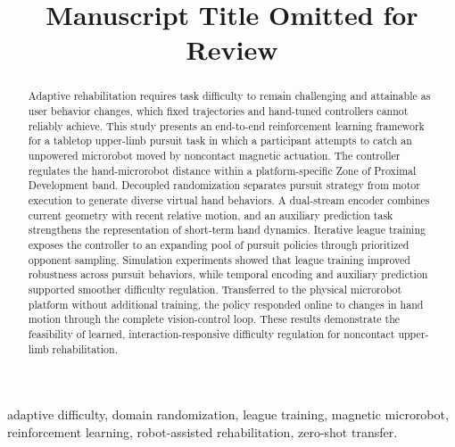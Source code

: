 \documentclass[journal,twoside,web]{ieeecolor2}
\begin{document}
\title{Manuscript Title Omitted for Review}
\author{}
\maketitle
\begin{abstract}
Adaptive rehabilitation requires task difficulty to remain challenging and attainable as user behavior changes, which fixed trajectories and hand-tuned controllers cannot reliably achieve. This study presents an end-to-end reinforcement learning framework for a tabletop upper-limb pursuit task in which a participant attempts to catch an unpowered microrobot moved by noncontact magnetic actuation. The controller regulates the hand-microrobot distance within a platform-specific Zone of Proximal Development band. Decoupled randomization separates pursuit strategy from motor execution to generate diverse virtual hand behaviors. A dual-stream encoder combines current geometry with recent relative motion, and an auxiliary prediction task strengthens the representation of short-term hand dynamics. Iterative league training exposes the controller to an expanding pool of pursuit policies through prioritized opponent sampling. Simulation experiments showed that league training improved robustness across pursuit behaviors, while temporal encoding and auxiliary prediction supported smoother difficulty regulation. Transferred to the physical microrobot platform without additional training, the policy responded online to changes in hand motion through the complete vision-control loop. These results demonstrate the feasibility of learned, interaction-responsive difficulty regulation for noncontact upper-limb rehabilitation.
\end{abstract}
\begin{IEEEkeywords}
adaptive difficulty, domain randomization, league training, magnetic microrobot, reinforcement learning, robot-assisted rehabilitation, zero-shot transfer.
\end{IEEEkeywords}
\end{document}
